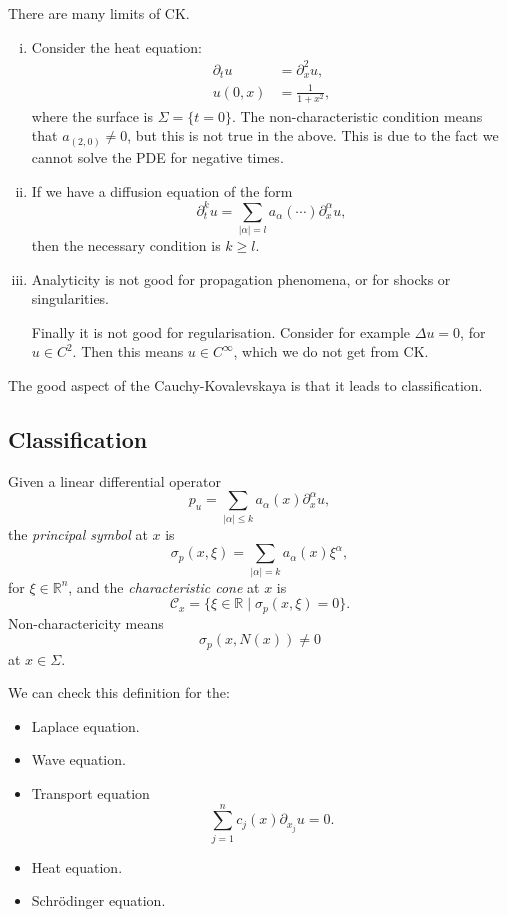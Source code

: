 \documentclass[12pt]{article}
\begin{document}
There are many limits of CK.
\begin{enumerate}[(i)]
	\item Consider the heat equation:
		\begin{align*}
			\partial_t u &= \partial^2_x u, \\
			u(0, x) &= \frac{1}{1 + x^2},
		\end{align*}
		where the surface is $\Sigma = \{t = 0\}$. The non-characteristic condition means that $a_{(2, 0)} \neq 0$, but this is not true in the above. This is due to the fact we cannot solve the PDE for negative times.
	\item If we have a diffusion equation of the form
		\[
		\partial_t^{k} u = \sum_{|\alpha| = l} a_\alpha(\cdots) \partial^{\alpha}_x u,
		\]
		then the necessary condition is $k \geq l$.
	\item Analyticity is not good for propagation phenomena, or for shocks or singularities.

		Finally it is not good for regularisation. Consider for example $\Delta u = 0$, for $u \in C^2$. Then this means $u \in C^{\infty}$, which we do not get from CK.
\end{enumerate}

The good aspect of the Cauchy-Kovalevskaya is that it leads to classification.

\subsection{Classification}%
\label{sub:cfs}

\begin{definition}
	Given a linear differential operator
	\[
	p_u = \sum_{|\alpha| \leq k} a_\alpha(x) \partial^{\alpha}_x u,
	\]
	the \emph{principal symbol} at $x$ is
	\[
	\sigma_p(x, \xi) = \sum_{|\alpha|= k}a_\alpha(x) \xi^{\alpha},
	\]
	for $\xi \in \mathbb{R}^n$, and the \emph{characteristic cone} at $x$ is
	\[
	\mathcal{C}_x = \{\xi \in \mathbb{R} \mid \sigma_p(x, \xi) = 0\}.
	\]
	Non-charactericity means
	\[
	\sigma_p(x, N(x)) \neq 0
	\]
	at $x \in \Sigma$.
\end{definition}

We can check this definition for the:
\begin{itemize}
	\item Laplace equation.
	\item Wave equation.
	\item Transport equation
		\[
		\sum_{j = 1}^n c_j(x) \partial_{x_j} u = 0.
		\]
	\item Heat equation.
	\item Schr\"odinger equation.
\end{itemize}
\end{document}
